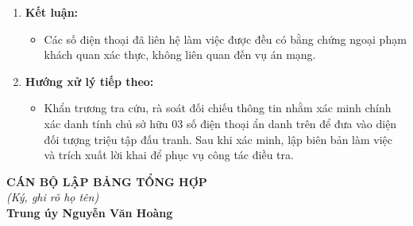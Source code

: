\documentclass[12pt,a4paper]{article}
\begin{document}
\begin{enumerate}[label=\arabic*., leftmargin=*, itemsep=2pt, topsep=2pt, parsep=0pt]
  \item \textbf{Kết luận:}
\begin{itemize}[leftmargin=*, itemsep=2pt, topsep=2pt, parsep=0pt]
  \item Các số điện thoại đã liên hệ làm việc được đều có bằng chứng ngoại phạm khách quan xác thực, không liên quan đến vụ án mạng.
\end{itemize}
  \item \textbf{Hướng xử lý tiếp theo:}
\begin{itemize}[leftmargin=*, itemsep=2pt, topsep=2pt, parsep=0pt]
  \item Khẩn trương tra cứu, rà soát đối chiếu thông tin nhằm xác minh chính xác danh tính chủ sở hữu 03 số điện thoại ẩn danh trên để đưa vào diện đối tượng triệu tập đấu tranh. Sau khi xác minh, lập biên bản làm việc và trích xuất lời khai để phục vụ công tác điều tra.
\end{itemize}
\end{enumerate}
\vspace{0.8cm}
\noindent
\hfill
\begin{minipage}[t]{0.50\textwidth}
    \begin{center}
        \textbf{CÁN BỘ LẬP BẢNG TỔNG HỢP}\\[0.1cm]
        \textit{(Ký, ghi rõ họ tên)}\\[1.6cm]
        \textbf{Trung úy Nguyễn Văn Hoàng}
    \end{center}
\end{minipage}
\end{document}
